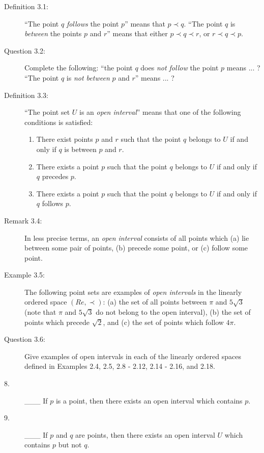 \documentclass{book}
\begin{document}
\begin{description}

\item[Definition 3.1:] ``The point $q$ \emph{follows} the point $p$'' means that $p \prec q$. ``The point $q$ is \emph{between} the points $p$ and $r$'' means that either $p \prec q \prec r$, or $r \prec q \prec p$.

\item[Question 3.2:] Complete the following: ``the point $q$ does \emph{not follow} the point $p$ means ... ? ``The point $q$ is \emph{not between} $p$ and $r$'' means ... ?

\item[Definition 3.3:] ``The point set $U$ is an \emph{open interval}'' means that one of the following conditions is satisfied:
\begin{enumerate}[\hspace{1cm}(a)]
  \item There exist points $p$ and $r$ such that the point $q$ belongs to $U$ if and only if $q$ is between $p$ and $r$.
  \item There exists a point $p$ such that the point $q$ belongs to $U$ if and only if $q$ precedes $p$.
  \item There exists a point $p$ such that the point $q$ belongs to $U$ if and only if $q$ follows $p$.
\end{enumerate}

\item[Remark 3.4:] In less precise terms, an \emph{open interval} consists of all points which (a) lie between some pair of points, (b) precede some point, or (c) follow some point.

\item[Example 3.5:] The following point sets are examples of \emph{open intervals} in the linearly ordered space $(Re, \prec )$: (a) the set of all points between $\pi$ and $5 \sqrt{3}$ (note that $\pi$ and $5 \sqrt{3}$ do not belong to the open interval), (b) the set of points which precede $\sqrt{2}$, and (c) the set of points which follow $4 \pi$.

\item[Question 3.6:] Give examples of open intervals in each of the linearly ordered spaces defined in Examples 2.4, 2.5, 2.8 - 2.12, 2.14 - 2.16, and 2.18.

\item[8.] \_\_\_ If $p$ is a point, then there exists an open interval which contains $p$.

\item[9.] \_\_\_ If $p$ and $q$ are points, then there exists an open interval $U$ which contains $p$ but not $q$.


\end{description}
\end{document}
